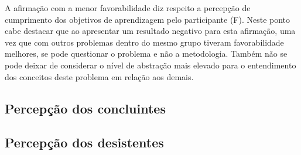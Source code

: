 A afirmação com a menor favorabilidade diz respeito
a percepção de cumprimento dos objetivos de aprendizagem
pelo participante (F).
Neste ponto cabe destacar que ao apresentar um resultado
negativo para esta afirmação, uma vez que com outros
problemas dentro do mesmo grupo tiveram favorabilidade
melhores, se pode questionar o problema e não
a metodologia.
Também não se pode deixar de considerar o nível de abstração
mais elevado para o entendimento dos conceitos deste
problema em relação aos demais.


\subsection{Percepção dos concluintes}

\subsection{Percepção dos desistentes}
